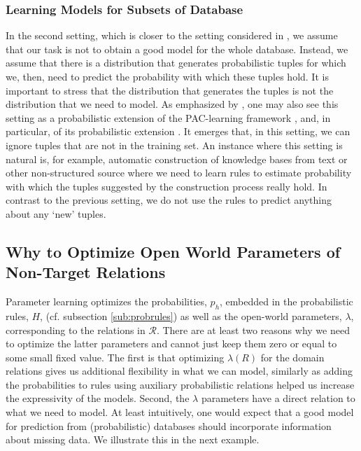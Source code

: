 \documentclass[akbc,twoside,11pt]{article}
\newcounter{example}
\newcommand{\ondrej}[1]{\textcolor{red}{O: {#1}}}
\newcommand{\guy}[1]{\textcolor{red}{G: {#1}}}
\begin{document}
\subsubsection{Learning Models for Subsets of Database}

In the second setting, which is closer to the setting considered in \citet{DBLP:conf/ijcai/RaedtDTBV15}, we assume that our task is not to obtain a good model for the whole database. Instead, we assume that there is a distribution that generates probabilistic tuples for which we, then, need to predict the probability with which these tuples hold. It is important to stress that the distribution that generates the tuples is not the distribution that we need to model. As emphasized by \citet{DBLP:conf/ijcai/RaedtDTBV15}, one may also see this setting as a probabilistic extension of the PAC-learning framework \cite{valiant1984theory}, and, in particular, of its probabilistic extension \cite{kearns1994efficient}. It emerges that, in this setting, we can ignore tuples that are not in the training set.
An instance where this setting is natural is, for example, automatic construction of knowledge bases from text or other non-structured source where we need to learn rules to estimate probability with which the tuples suggested by the construction process really hold. In contrast to the previous setting, we do not use the rules to predict anything about any `new' tuples. 

\iffalse %
\subsection{Why to Optimize Open World Parameters of Non-Target Relations}


Parameter learning optimizes the probabilities, $p_h$, embedded in the probabilistic rules, $H$, (cf. subsection \ref{sub:probrules}) %
as well as the open-world parameters, $\lambda$, corresponding to the relations in $\mathcal{R}$. There are at least two reasons why we need to optimize the latter parameters and cannot just keep them zero or equal to some small fixed value. The first is that optimizing $\lambda(R)$ for the domain relations gives us additional flexibility in what we can model, similarly as adding the probabilities to rules using auxiliary probabilistic relations helped us increase the expressivity of the models. Second, the $\lambda$ parameters have a direct relation to what we need to model. At least intuitively, one would expect that a good model for prediction from (probabilistic) databases should incorporate information about missing data. We illustrate this in the next example.
\end{document}
